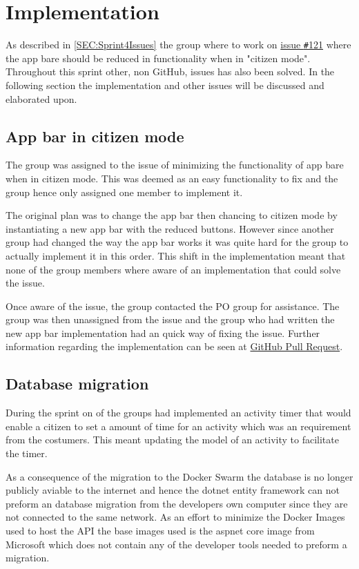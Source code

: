 \section{Implementation}
As described in \autoref{SEC:Sprint4Issues} the group where to work on \href{https://github.com/aau-giraf/weekplanner/issues/121}{issue \texttt{\#}121} where the app bare should be reduced in functionality when in "citizen mode". 
Throughout this sprint other, non GitHub, issues has also been solved.
In the following section the implementation and other issues will be discussed and elaborated upon.

\subsection{App bar in citizen mode}
The group was assigned to the issue of minimizing the functionality of app bare when in citizen mode. 
This was deemed as an easy functionality to fix and the group hence only assigned one member to implement it. 

The original plan was to change the app bar then chancing to citizen mode by instantiating a new app bar with the reduced buttons. 
However since another group had changed the way the app bar works it was quite hard for the group to actually implement it in this order.
This shift in the implementation meant that none of the group members where aware of an implementation that could solve the issue. 

Once aware of the issue, the group contacted the PO group for assistance. 
The group was then unassigned from the issue and the group who had written the new app bar implementation had an quick way of fixing the issue. 
Further information regarding the implementation can be seen at \href{https://github.com/aau-giraf/weekplanner/pull/262}{GitHub Pull Request}.

\subsection{Database migration}
During the sprint on of the groups had implemented an activity timer that would enable a citizen to set a amount of time for an activity which was an requirement from the costumers.
This meant updating the model of an activity to facilitate the timer. 

As a consequence of the migration to the Docker Swarm the database is no longer publicly aviable to the internet and hence the dotnet entity framework can not preform an database migration from the developers own computer since they are not connected to the same network. 
As an effort to minimize the Docker Images used to host the API the base images used is the aspnet core image from Microsoft which does not contain any of the developer tools needed to preform a migration. 


